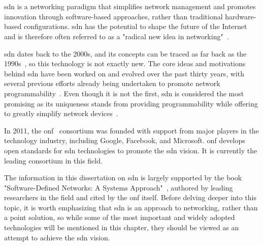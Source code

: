 
%

\chapter[Software Defined Networking]{} %
\label{cha:sdn}

\gls{sdn} is a networking paradigm that simplifies network management and promotes innovation through software-based approaches, rather than traditional hardware-based configurations. \gls{sdn} has the potential to shape the future of the Internet and is therefore often referred to as a "radical new idea in networking"~\cite{nunes_survey_2014}. 

\gls{sdn} dates back to the 2000s, and its concepts can be traced as far back as the 1990s~\cite{feamster_road_2013}, so this technology is not exactly new. The core ideas and motivations behind \gls{sdn} have been worked on and evolved over the past thirty years, with several previous efforts already being undertaken to promote network programmability~\cite{feamster_road_2013}. Even though it is not the first, \gls{sdn} is considered the most promising as its uniqueness stands from providing programmability while offering to greatly simplify network devices~\cite{xia_survey_2015}.  

In 2011, the \gls{onf}~\cite{noauthor_open_nodate} consortium was founded with support from major players in the technology industry, including Google, Facebook, and Microsoft. \gls{onf} develops open standards for \gls{sdn} technologies to promote the \gls{sdn} vision. It is currently the leading consortium in this field.  

The information in this dissertation on \gls{sdn} is largely supported by the book "Software-Defined Networks: A Systems Approach"~\cite{peterson_software-defined_2021}, authored by leading researchers in the field and cited by the \gls{onf} itself. Before delving deeper into this topic, it is worth emphasizing that \gls{sdn} is an approach to networking, rather than a point solution, so while some of the most important and widely adopted technologies will be mentioned in this chapter, they should be viewed as an attempt to achieve the \gls{sdn} vision.


